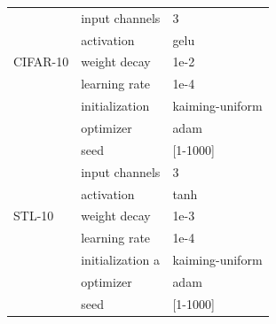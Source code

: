 \begin{table}[ht!]
\begin{minipage}{0.58\textwidth}
{\begin{tabularx}{\linewidth}{lll}
        \multirow{5}{*}{CIFAR-10} & input channels          & 3                \\
                               & activation              & gelu             \\
                               & weight decay                      & 1e-2             \\
                               & learning rate                      & 1e-4             \\
                               & initialization          & kaiming-uniform  \\
                               & optimizer               & adam             \\
                               & seed                    & [1-1000]         \\
        \cmidrule(r){1-1} \cmidrule(rl){2-2}  \cmidrule(rl){3-3}%
        \multirow{5}{*}{STL-10}& input channels          & 3                \\
                               & activation              & tanh             \\
                               & weight decay                      & 1e-3             \\
                               & learning rate                      & 1e-4             \\
                               & initialization  a        & kaiming-uniform  \\
                               & optimizer               & adam             \\
                               & seed                    & [1-1000]         \\
        \bottomrule
    \end{tabularx}
    \label{tab:model_zoo_hyperparameters}

    
    }
    \end{minipage}
\end{table}
\newpage
